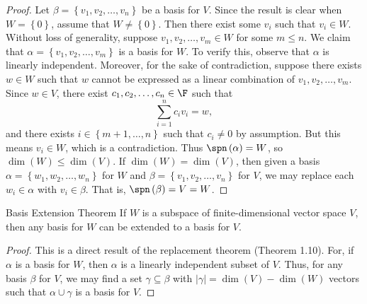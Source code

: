 \documentclass[linearalgebra]{subfiles}
\begin{document}
    \begin{proof}
        Let $\beta=\left\lbrace v_1,v_2,\ldots,v_n \right\rbrace$ be a basis for $V$. Since the result is clear when $W=\left\lbrace 0 \right\rbrace $, assume that $W\neq \left\lbrace 0 \right\rbrace$. Then there exist some $v_i$ such that $v_i\in W$. Without loss of generality, suppose $v_1,v_2,\ldots,v_m\in W$ for some $m\leq n$. We claim that $\alpha=\left\lbrace v_1,v_2,\ldots,v_m \right\rbrace$ is a basis for $W$. To verify this, observe that $\alpha$ is linearly independent. Moreover, for the sake of contradiction, suppose there exists $w\in W$ such that $w$ cannot be expressed as a linear combination of $v_1,v_2,\ldots,v_m$. Since $w\in V$, there exist $c_1,c_2,\ldots,c_n\in\F$ such that
        \begin{equation*}
            \sum^{n}_{i=1} c_iv_i = w,
        \end{equation*}
        and there exists $i\in\left\lbrace m+1,\ldots,n \right\rbrace$ such that $c_i\neq 0$ by assumption. But this means $v_i\in W$, which is a contradiction. Thus $\spn\left( \alpha \right) = W$, so $\dim(W)\leq\dim(V)$. If $\dim(W)=\dim(V)$, then given a basis $\alpha = \left\lbrace w_1,w_2,\ldots,w_n \right\rbrace$ for $W$ and $\beta = \left\lbrace v_1,v_2,\ldots,v_n \right\rbrace$ for $V$, we may replace each $w_i\in\alpha$ with $v_i\in\beta$. That is, $\spn\left( \beta \right) = V = W$.
    \end{proof}

    \begin{theorem}{Basis Extension Theorem}
        If $W$ is a subspace of finite-dimensional vector space $V$, then any basis for $W$ can be extended to a basis for $V$.
    \end{theorem}

    \begin{proof}
        This is a direct result of the replacement theorem (Theorem 1.10). For, if $\alpha$ is a basis for $W$, then $\alpha$ is a linearly independent subset of $V$. Thus, for any basis $\beta$ for $V$, we may find a set $\gamma\subseteq\beta$ with $\left| \gamma \right| = \dim\left( V \right) - \dim\left( W \right)$ vectors such that $\alpha\cup\gamma$ is a basis for $V$.
    \end{proof}
\end{document}

